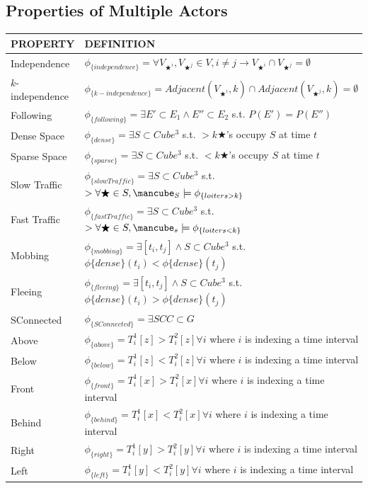 \subsection{Properties of Multiple Actors}
\begin{tabular}{| p{2.8cm} | p{11.5cm} | }
\hline
PROPERTY & DEFINITION \\ \hline
 Independence& $\phi_{\{independence\}} =  \forall V_{\bigstar^i},V_{\bigstar^j} \in V, i \neq j \rightarrow V_{\bigstar^i} \cap V_{\bigstar^j} = \emptyset $ \\ \hline
  $k$-independence& $\phi_{\{k-independence\}} =  Adjacent(V_{\bigstar^i}, k) \cap Adjacent(V_{\bigstar^j}, k) = \emptyset $ \\ \hline
 Following & $\phi_{\{following\}} =  \exists E' \subset E_1 \land E'' \subset E_2$ s.t. $P(E')=P(E'') $  \\ \hline
 Dense Space & $\phi_{\{dense\}} = \exists S \subset Cube^3$ s.t. $> k \bigstar$'s occupy $S$ at time $t$\\ \hline
 Sparse Space & $\phi_{\{sparse\}} = \exists S \subset Cube^3$ s.t. $< k \bigstar$'s occupy $S$ at time $t$\\ \hline
 Slow Traffic& $\phi_{\{slowTraffic\}} = \exists S \subset Cube^3$ s.t. $> \forall \bigstar \in S, \cube_S \models \phi_{\{loiters>k\}}$ \\ \hline
 Fast Traffic & $\phi_{\{fastTraffic\}} = \exists S \subset Cube^3$ s.t. $> \forall \bigstar \in S, \cube_s \models \phi_{\{loiters<k\}}$ \\ \hline
 Mobbing& $\phi_{\{mobbing\}} = \exists [t_i, t_j] \land S \subset Cube^3$ s.t. $ \phi{\{dense\}}(t_i) < \phi{\{dense\}}(t_j)$ \\ \hline
 Fleeing& $\phi_{\{fleeing\}} = \exists [t_i, t_j] \land S \subset Cube^3$ s.t. $ \phi{\{dense\}}(t_i) > \phi{\{dense\}}(t_j)$ \\ \hline
 SConnected& $\phi_{\{SConnected\}} = \exists SCC \subset G$ \\ \hline
 Above & $\phi_{\{above\}} =  T^1_i[z] > T^2_i[z] \forall i$ where $i$ is indexing a time interval\\ \hline
 Below & $\phi_{\{below\}} = T^1_i[z] < T^2_i[z]  \forall i$ where $i$ is indexing a time interval\\ \hline
 Front & $\phi_{\{front\}} = T^1_i[x] > T^2_i[x]  \forall i$ where $i$ is indexing a time interval\\ \hline
 Behind & $\phi_{\{behind\}} = T^1_i[x] < T^2_i[x]  \forall i$ where $i$ is indexing a time interval\\ \hline
 Right & $\phi_{\{right\}} = T^1_i[y] > T^2_i[y]  \forall i$ where $i$ is indexing a time interval \\ \hline
 Left & $\phi_{\{left\}} = T^1_i[y] < T^2_i[y]  \forall i$ where $i$ is indexing a time interval \\ \hline
\end{tabular}

